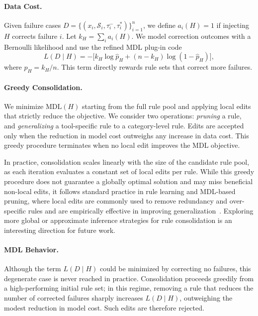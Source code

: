 \documentclass[11pt]{article}
\begin{document}
\paragraph{Data Cost.}
Given failure cases \( D = \{(x_i, \mathcal{S}_i, \tau_i^-, \tau_i^*)\}_{i=1}^n \), we define
\( a_i(H) = 1 \) if injecting \( H \) corrects failure \( i \). Let
\( k_H = \sum_i a_i(H) \). We model correction outcomes with a Bernoulli likelihood and
use the refined MDL plug-in code
\[
L(D \mid H) = -\bigl[k_H \log \hat{p}_H + (n-k_H)\log(1-\hat{p}_H)\bigr],
\]
where \( \hat{p}_H = k_H/n \). This term directly rewards rule sets that correct more failures.

\paragraph{Greedy Consolidation.}
We minimize \( \mathrm{MDL}(H) \) starting from the full rule pool and applying local edits
that strictly reduce the objective. We consider two operations: \emph{pruning} a rule, and
\emph{generalizing} a tool-specific rule to a category-level rule. Edits are accepted only
when the reduction in model cost outweighs any increase in data cost. This greedy procedure
terminates when no local edit improves the MDL objective.

In practice, consolidation scales linearly with the size of the candidate rule pool, as each iteration evaluates a constant set of local edits per rule. While this greedy procedure does not guarantee a globally optimal solution and may miss beneficial non-local edits, it follows standard practice in rule learning and MDL-based pruning, where local edits are commonly used to remove redundancy and over-specific rules and are empirically effective in improving generalization~\citep{Quinlan87Simplifying,Furnkranz97Pruning,Grunwald07MDL}. Exploring more global or approximate inference strategies for rule consolidation is an interesting direction for future work.


\paragraph{MDL Behavior.}
Although the term \( L(D \mid H) \) could be minimized by correcting no failures,
this degenerate case is never reached in practice. Consolidation proceeds greedily from a
high-performing initial rule set; in this regime, removing a rule that reduces the number
of corrected failures sharply increases \( L(D \mid H) \), outweighing the modest reduction
in model cost. Such edits are therefore rejected.
\end{document}
